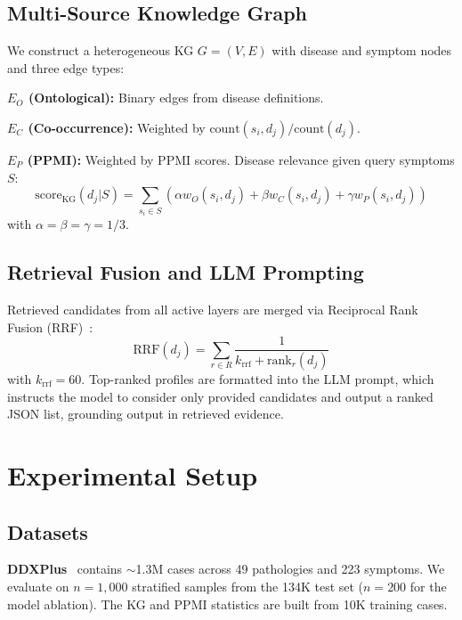 \documentclass[runningheads]{llncs}
\begin{document}
\subsection{Multi-Source Knowledge Graph}
\label{sec:kg}

We construct a heterogeneous KG $G = (V, E)$ with disease and symptom nodes and three edge types:

\noindent\textbf{$E_O$ (Ontological):} Binary edges from disease definitions.

\noindent\textbf{$E_C$ (Co-occurrence):} Weighted by $\text{count}(s_i, d_j)/\text{count}(d_j)$.

\noindent\textbf{$E_P$ (PPMI):} Weighted by PPMI scores.
Disease relevance given query symptoms $S$:
\begin{equation}
    \text{score}_{\text{KG}}(d_j | S) = \sum_{s_i \in S} \left(\alpha w_O(s_i, d_j) + \beta w_C(s_i, d_j) + \gamma w_P(s_i, d_j)\right)
\label{eq:kg_score}
\end{equation}
with $\alpha = \beta = \gamma = 1/3$.

\subsection{Retrieval Fusion and LLM Prompting}
\label{sec:fusion}

Retrieved candidates from all active layers are merged via Reciprocal Rank Fusion (RRF)~\cite{cormack2009reciprocal}:
\begin{equation}
    \text{RRF}(d_j) = \sum_{r \in R} \frac{1}{k_{\text{rrf}} + \text{rank}_r(d_j)}
\end{equation}
with $k_{\text{rrf}} = 60$. Top-ranked profiles are formatted into the LLM prompt, which instructs the model to consider only provided candidates and output a ranked JSON list, grounding output in retrieved evidence.

\section{Experimental Setup}
\label{sec:experiments}

\subsection{Datasets}

\textbf{DDXPlus}~\cite{fansi2022ddxplus} contains ${\sim}$1.3M cases across 49 pathologies and 223 symptoms. We evaluate on $n{=}1{,}000$ stratified samples from the 134K test set ($n{=}200$ for the model ablation). The KG and PPMI statistics are built from 10K training cases.
\end{document}
